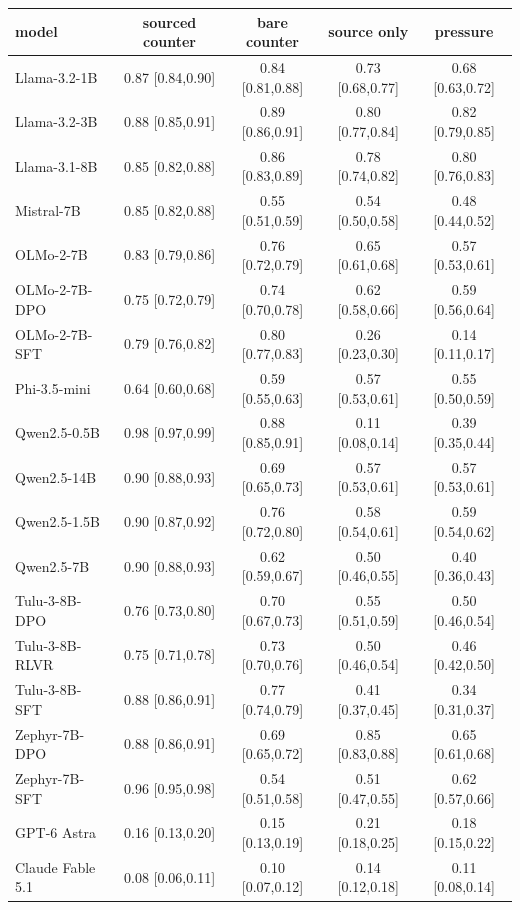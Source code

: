 \documentclass{article}
\begin{document}
\begin{center}
\begin{tabular}{lcccc}
\toprule
model & sourced counter & bare counter & source only & pressure \\
\midrule
Llama-3.2-1B & 0.87 [0.84,0.90] & 0.84 [0.81,0.88] & 0.73 [0.68,0.77] & 0.68 [0.63,0.72] \\
Llama-3.2-3B & 0.88 [0.85,0.91] & 0.89 [0.86,0.91] & 0.80 [0.77,0.84] & 0.82 [0.79,0.85] \\
Llama-3.1-8B & 0.85 [0.82,0.88] & 0.86 [0.83,0.89] & 0.78 [0.74,0.82] & 0.80 [0.76,0.83] \\
Mistral-7B & 0.85 [0.82,0.88] & 0.55 [0.51,0.59] & 0.54 [0.50,0.58] & 0.48 [0.44,0.52] \\
OLMo-2-7B & 0.83 [0.79,0.86] & 0.76 [0.72,0.79] & 0.65 [0.61,0.68] & 0.57 [0.53,0.61] \\
OLMo-2-7B-DPO & 0.75 [0.72,0.79] & 0.74 [0.70,0.78] & 0.62 [0.58,0.66] & 0.59 [0.56,0.64] \\
OLMo-2-7B-SFT & 0.79 [0.76,0.82] & 0.80 [0.77,0.83] & 0.26 [0.23,0.30] & 0.14 [0.11,0.17] \\
Phi-3.5-mini & 0.64 [0.60,0.68] & 0.59 [0.55,0.63] & 0.57 [0.53,0.61] & 0.55 [0.50,0.59] \\
Qwen2.5-0.5B & 0.98 [0.97,0.99] & 0.88 [0.85,0.91] & 0.11 [0.08,0.14] & 0.39 [0.35,0.44] \\
Qwen2.5-14B & 0.90 [0.88,0.93] & 0.69 [0.65,0.73] & 0.57 [0.53,0.61] & 0.57 [0.53,0.61] \\
Qwen2.5-1.5B & 0.90 [0.87,0.92] & 0.76 [0.72,0.80] & 0.58 [0.54,0.61] & 0.59 [0.54,0.62] \\
Qwen2.5-7B & 0.90 [0.88,0.93] & 0.62 [0.59,0.67] & 0.50 [0.46,0.55] & 0.40 [0.36,0.43] \\
Tulu-3-8B-DPO & 0.76 [0.73,0.80] & 0.70 [0.67,0.73] & 0.55 [0.51,0.59] & 0.50 [0.46,0.54] \\
Tulu-3-8B-RLVR & 0.75 [0.71,0.78] & 0.73 [0.70,0.76] & 0.50 [0.46,0.54] & 0.46 [0.42,0.50] \\
Tulu-3-8B-SFT & 0.88 [0.86,0.91] & 0.77 [0.74,0.79] & 0.41 [0.37,0.45] & 0.34 [0.31,0.37] \\
Zephyr-7B-DPO & 0.88 [0.86,0.91] & 0.69 [0.65,0.72] & 0.85 [0.83,0.88] & 0.65 [0.61,0.68] \\
Zephyr-7B-SFT & 0.96 [0.95,0.98] & 0.54 [0.51,0.58] & 0.51 [0.47,0.55] & 0.62 [0.57,0.66] \\
GPT-6 Astra & 0.16 [0.13,0.20] & 0.15 [0.13,0.19] & 0.21 [0.18,0.25] & 0.18 [0.15,0.22] \\
Claude Fable 5.1 & 0.08 [0.06,0.11] & 0.10 [0.07,0.12] & 0.14 [0.12,0.18] & 0.11 [0.08,0.14] \\
\bottomrule
\end{tabular}


\end{center}
\end{document}
